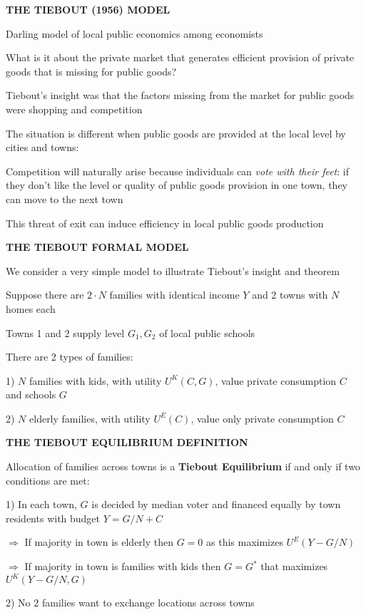 \documentclass[landscape]{slides}
\begin{document}
%


\begin{slide}
\begin{center}
{\bf THE TIEBOUT (1956) MODEL}
\end{center}
Darling model of local public economics among economists

What is it about the private market that generates efficient provision of private goods that is missing for public goods?

Tiebout's insight was that the factors missing from the market for public goods were shopping and competition

The situation is different when public goods are provided at the local level by cities and towns:

Competition will naturally arise because individuals can \emph{vote with their feet}: if they don't like the level or quality of public goods provision in one town, they can move to the next town

This threat of exit can induce efficiency in local public goods production
\end{slide}

\begin{slide}
\begin{center}
{\bf THE TIEBOUT FORMAL MODEL}
\end{center}
We consider a very simple model to illustrate Tiebout's insight and theorem

Suppose there are $2\cdot N$ families with identical income $Y$ and 2 towns with $N$ homes
each

Towns 1 and 2 supply level $G_1, G_2$ of local public schools

There are 2 types of families:

1) $N$ families with kids, with utility $U^K(C,G)$, value private consumption $C$ and schools $G$

2) $N$ elderly families, with utility $U^E(C)$, value only private consumption $C$
\end{slide}

\begin{slide}
\begin{center}
{\bf THE TIEBOUT  EQUILIBRIUM DEFINITION}
\end{center}

Allocation of families across towns is a \textbf{Tiebout Equilibrium} if and only if two conditions are met:

1) In each town, $G$ is decided by median voter and financed equally by town
residents with budget $Y=G/N+C$

$\Rightarrow$ If majority in town is elderly then $G=0$ as this maximizes $U^E(Y-G/N)$

$\Rightarrow$ If majority in town is families with kids then $G=G^*$ that maximizes $U^K(Y-G/N,G)$

2) No 2 families want to exchange locations across towns

\end{slide}
\end{document}
